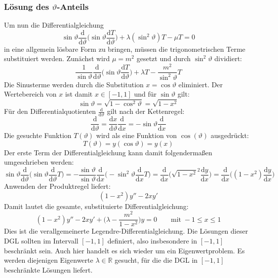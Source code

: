 \documentclass[9pt]{report}
\begin{document}
\subsubsection{Lösung des $\vartheta$-Anteils}
Um nun die Differentialgleichung
\begin{equation}
\sin\vartheta\frac{\mathrm{d}}{\mathrm{d}\vartheta}\Big(\sin\vartheta\frac{\mathrm{d}T}{\mathrm{d}\vartheta}\Big)+\lambda(\sin^{2}\vartheta)T-\mu T=0
\end{equation}
in eine allgemein lösbare Form zu bringen, müssen die trigonometrischen Terme substituiert werden. Zunächst wird $\mu=m^2$ gesetzt und durch $\sin^{2}\vartheta$ dividiert:
\begin{equation}
\frac{1}{\sin\vartheta}\frac{\mathrm{d}}{\mathrm{d}\vartheta}\Big(\sin\vartheta\frac{\mathrm{d}T}{\mathrm{d}\vartheta}\Big)+\lambda T-\frac{m^2}{\sin^{2}\vartheta}T
\end{equation}
Die Sinusterme werden durch die Substitution $x=\cos\vartheta$ eliminiert. Der Wertebereich von $x$ ist damit $x\in[-1,1]$ und für $\sin\vartheta$ gilt:
\begin{equation}
\sin\vartheta=\sqrt{1-\cos^{2}\vartheta}=\sqrt{1-x^2}
\end{equation}
Für den Differentialquotienten $\frac{\mathrm{d}}{\mathrm{d}\vartheta}$ gilt nach der Kettenregel:
\begin{equation}
\frac{\mathrm{d}}{\mathrm{d}\vartheta}=\frac{\mathrm{d}x}{\mathrm{d}\vartheta}\frac{\mathrm{d}}{\mathrm{d}x}=-\sin\vartheta\frac{\mathrm{d}}{\mathrm{d}x}
\end{equation}
Die gesuchte Funktion $T(\vartheta)$ wird als eine Funktion von $\cos(\vartheta)$ ausgedrückt:
\begin{equation}
T(\vartheta)=y(\cos\vartheta)=y(x)
\end{equation}
Der erste Term der Differentialgleichung kann damit folgendermaßen umgeschrieben werden:
\begin{equation}
\sin\vartheta\frac{\mathrm{d}}{\mathrm{d}\vartheta}\Big(\sin\vartheta\frac{\mathrm{d}}{\mathrm{d}\vartheta}T\Big)=-\frac{\sin\vartheta}{\sin\vartheta}\frac{\mathrm{d}}{\mathrm{d}x}\Big(-\sin^{2}\vartheta\frac{\mathrm{d}}{\mathrm{d}x}T\Big)=\frac{\mathrm{d}}{\mathrm{d}x}\Big(\sqrt{1-x^2}^2\frac{\mathrm{d}y}{\mathrm{d}x}\Big)=\frac{\mathrm{d}}{\mathrm{d}x}\Big((1-x^2)\frac{\mathrm{d}y}{\mathrm{d}x}\Big)
\end{equation}
Anwenden der Produktregel liefert:
\begin{equation}
(1-x^2)y''-2xy'
\end{equation}
Damit lautet die gesamte, substituierte Differentialgleichung:
\begin{equation}
(1-x^2)y''-2xy'+\Big(\lambda-\frac{m^2}{1-x^2}\Big)y=0\qquad\mathrm{mit}\;-1\leq x\leq 1
\end{equation}
Dies ist die verallgemeinerte Legendre-Differentialgleichung. Die Lösungen dieser DGL sollten im Intervall $[-1,1]$ definiert, also insbesondere in $[-1,1]$ beschränkt sein. Auch hier handelt es sich wieder um ein Eigenwertproblem. Es werden diejenigen Eigenwerte $\lambda\in\mathbb{R}$ gesucht, für die die DGL in $[-1,1]$ beschränkte Lösungen liefert. 
\end{document}
